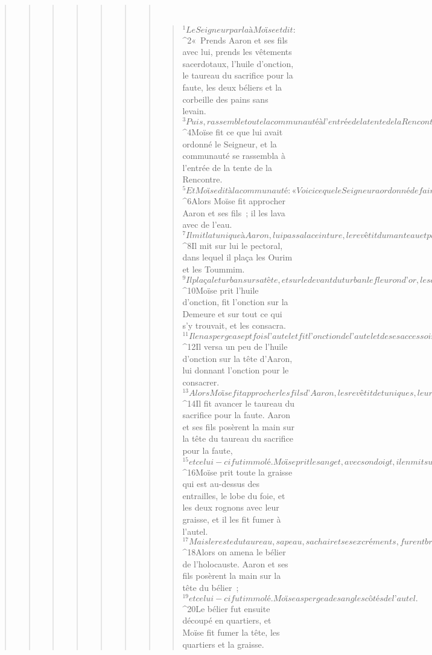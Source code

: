 \begin{verse}
\begin{verse}
\begin{verse}
\begin{verse}
\begin{verse}
\begin{verse}
\begin{verse}
         
      \bchapter{}
      \begin{verse}
${}^{1}Le Seigneur parla à Moïse et dit : 
${}^{2}« Prends Aaron et ses fils avec lui, prends les vêtements sacerdotaux, l’huile d’onction, le taureau du sacrifice pour la faute, les deux béliers et la corbeille des pains sans levain. 
${}^{3}Puis, rassemble toute la communauté à l’entrée de la tente de la Rencontre. »
${}^{4}Moïse fit ce que lui avait ordonné le Seigneur, et la communauté se rassembla à l’entrée de la tente de la Rencontre. 
${}^{5}Et Moïse dit à la communauté : « Voici ce que le Seigneur a ordonné de faire. »
${}^{6}Alors Moïse fit approcher Aaron et ses fils ; il les lava avec de l’eau. 
${}^{7}Il mit la tunique à Aaron, lui passa la ceinture, le revêtit du manteau et plaça sur lui l’éphod. Puis il le ceignit de l’écharpe de l’éphod et la fixa sur lui. 
${}^{8}Il mit sur lui le pectoral, dans lequel il plaça les Ourim et les Toummim. 
${}^{9}Il plaça le turban sur sa tête, et sur le devant du turban le fleuron d’or, le saint diadème, comme le Seigneur l’avait ordonné à Moïse.
${}^{10}Moïse prit l’huile d’onction, fit l’onction sur la Demeure et sur tout ce qui s’y trouvait, et les consacra. 
${}^{11}Il en aspergea sept fois l’autel et fit l’onction de l’autel et de ses accessoires, de la cuve et de son support, pour les consacrer. 
${}^{12}Il versa un peu de l’huile d’onction sur la tête d’Aaron, lui donnant l’onction pour le consacrer.
${}^{13}Alors Moïse fit approcher les fils d’Aaron, les revêtit de tuniques, leur mit une ceinture et les coiffa de tiares, comme le Seigneur le lui avait ordonné.
${}^{14}Il fit avancer le taureau du sacrifice pour la faute. Aaron et ses fils posèrent la main sur la tête du taureau du sacrifice pour la faute, 
${}^{15}et celui-ci fut immolé. Moïse prit le sang et, avec son doigt, il en mit sur les cornes de l’autel, tout autour, pour ôter de l’autel la faute. Puis il versa le sang à la base de l’autel. Alors il consacra l’autel en accomplissant sur lui le rite d’expiation. 
${}^{16}Moïse prit toute la graisse qui est au-dessus des entrailles, le lobe du foie, et les deux rognons avec leur graisse, et il les fit fumer à l’autel. 
${}^{17}Mais le reste du taureau, sa peau, sa chair et ses excréments, furent brûlés au feu hors du camp, comme le Seigneur l’avait ordonné à Moïse.
${}^{18}Alors on amena le bélier de l’holocauste. Aaron et ses fils posèrent la main sur la tête du bélier ; 
${}^{19}et celui-ci fut immolé. Moïse aspergea de sang les côtés de l’autel. 
${}^{20}Le bélier fut ensuite découpé en quartiers, et Moïse fit fumer la tête, les quartiers et la graisse. 

\end{verse}
\end{verse}
\end{verse}
\end{verse}
\end{verse}
\end{verse}
\end{verse}
\end{verse}
